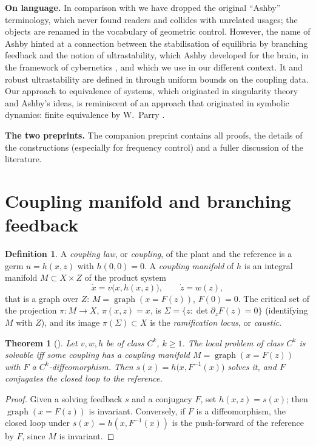 \documentclass[11pt,reqno]{amsart}
\theoremstyle{plain}
\newtheorem*{theorem}{Theorem}
\theoremstyle{remark}
\theoremstyle{definition}
\newtheorem*{definition}{Definition}
\DeclareMathOperator{\graph}{graph}
\newcommand{\Sig}{\Sigma}
\begin{document}
\medskip
\noindent\textbf{On language.}
In comparison with \cite{Shosh1990} we have dropped the original ``Ashby''
terminology, which never found readers and collides with unrelated usages; the
objects are renamed in the vocabulary of geometric control. However, the name of Ashby hinted at a connection
between the stabilisation of equilibria by branching feedback and the notion of ultrastability, which Ashby
developed for the brain, in the framework of cybernetics \cite{Ashby1960}, and which we use in our different context. It and robust ultrastability are defined in \cite[\S3.3]{Companion} through uniform bounds on the coupling data. Our approach to equivalence of systems, which originated in singularity theory and Ashby's ideas, is reminiscent of an approach that originated in symbolic dynamics: finite equivalence by W.~Parry \cite{Parry1977}.

\medskip
\noindent\textbf{The two preprints.} The companion preprint \cite{Companion} contains all proofs, the details of the
constructions (especially for frequency control) and a fuller discussion of the literature.

\section{Coupling manifold and branching feedback}\label{sec:setup}

\begin{definition}
A \emph{coupling law}, or \emph{coupling}, of the plant and the reference is a germ $u=h(x,z)$ with $h(0,0)=0$. A \emph{coupling
manifold} of $h$ is an integral manifold $M\subset X\times Z$ of the product system
\[
  \dot x=v\bigl(x,h(x,z)\bigr),\qquad \dot z=w(z),
\]
that is a graph over $Z$: $M=\graph(x=F(z))$, $F(0)=0$. The critical set of the projection
$\pi\colon M\to X$, $\pi(x,z)=x$, is $\Sig=\{z:\det\partial_zF(z)=0\}$ (identifying $M$ with $Z$), and its image
$\pi(\Sig)\subset X$ is the \emph{ramification locus}, or \emph{caustic}.
\end{definition}

\begin{theorem}[{\cite[Thm.~2.2]{Shosh1990}}]
Let $v,w,h$ be of class $C^{k}$, $k\ge1$. The local problem of class $C^{k}$ is solvable iff some coupling has a
coupling manifold $M=\graph(x=F(z))$ with $F$ a $C^{k}$-diffeomorphism. Then $s(x)=h\bigl(x,F^{-1}(x)\bigr)$ solves
it, and $F$ conjugates the closed loop to the reference.
\end{theorem}
\begin{proof}
Given a solving feedback $s$ and a conjugacy $F$, set $h(x,z)=s(x)$; then $\graph(x=F(z))$ is invariant.
Conversely, if $F$ is a diffeomorphism, the closed loop under $s(x)=h(x,F^{-1}(x))$ is the push-forward of the
reference by $F$, since $M$ is invariant.
\end{proof}
\end{document}
